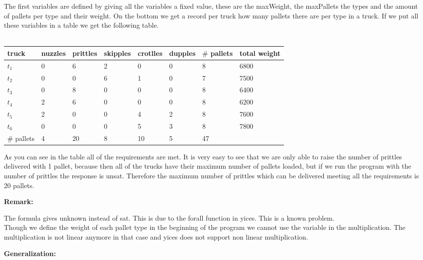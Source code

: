 \documentclass[12pt]{article}
\begin{document}
\noindent The first variables are defined by giving all the variables a fixed value, these are the maxWeight, the maxPallets the types and the amount of pallets per type and their weight. On the bottom we get a record per truck how many pallets there are per type in a truck. If we put all these variables in a table we get the following table.\\
\\
\begin{tabular}{| l | l | l | l | l | l | l | l |}
\hline
truck	& nuzzles	& prittles	& skipples	& crotlles	& dupples & $\#$ pallets & total weight\\
\hline
$t_1$	& 0	&	6	&	2	&	0	&	0	& 8 & 6800\\
$t_2$	& 0	&	0	&	6	&	1	&	0	& 7 & 7500\\
$t_3$	& 0	&	8	&	0	&	0	&	0	& 8 & 6400\\
$t_4$	& 2	&	6	&	0	&	0	&	0	& 8 & 6200\\
$t_5$	& 2	&	0	&	0	&	4	&	2	& 8 & 7600\\
$t_6$	& 0	&	0	&	0	&	5	&	3	& 8 & 7800\\
\hline
$\#$ pallets	&	4	&	20	&	8	&	10	&	5	&  47	&\\
\hline
\end{tabular}

\vspace{3mm}

\noindent As you can see in the table all of the requirements are met. It is very easy to see that we are only able to raise the number of prittles delivered with 1 pallet, because then all of the trucks have their maximum number of pallets loaded, but if we run the program with the number of prittles the response is unsat. Therefore the maximum number of prittles which can be delivered meeting all the requirements is 20 pallets.

\vspace{3mm}

{\bf Remark:}

\noindent The formula gives unknown instead of sat. This is due to the forall function in yices. This is a known problem.\\
Though we define the weight of each pallet type in the beginning of the program we cannot use the variable in the multiplication.
The multiplication is not linear anymore in that case and yices does not support non linear multiplication.

\vspace{3mm}

{\bf Generalization:}
\end{document}
